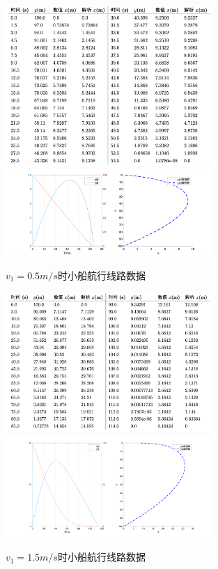 \documentclass{article}
\begin{document}
\begin{figure}[H]
    \centering
    \includegraphics[width=0.7\textwidth]{v05.png}
    \includegraphics[width=0.7\textwidth]{pic4.png}
    \caption{$v_1=0.5m/s$时小船航行线路数据}
\end{figure}

\begin{figure}[H]
    \centering
    \includegraphics[width=0.7\textwidth]{v15.png}
    \includegraphics[width=0.7\textwidth]{pic5.png}
    \caption{$v_1=1.5m/s$时小船航行线路数据}
\end{figure}
\end{document}
